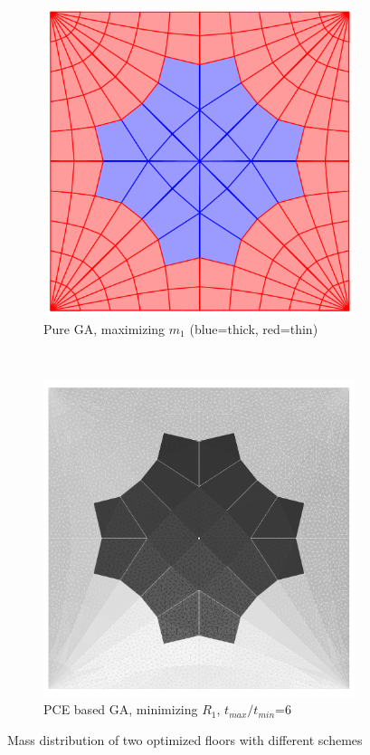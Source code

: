 \begin{figure}[H]
\begin{subfigure}[c]{.49\textwidth}
  \centering
  \includegraphics[width=.99\linewidth]{images/opt_m1}
  \caption{Pure GA, maximizing $m_1$ (blue=thick, red=thin)}
\end{subfigure}
~
\begin{subfigure}[c]{.49\textwidth}
  \centering
  \includegraphics[width=.985\linewidth]{images/t_opt_l2d10_gamma6}
  \caption{PCE based GA, minimizing $R_1$, $t_{max}/t_{min}$=6}
\end{subfigure}

\caption{Mass distribution of two optimized floors with different schemes}
\label{fig:comp_opt}
\end{figure}
 
